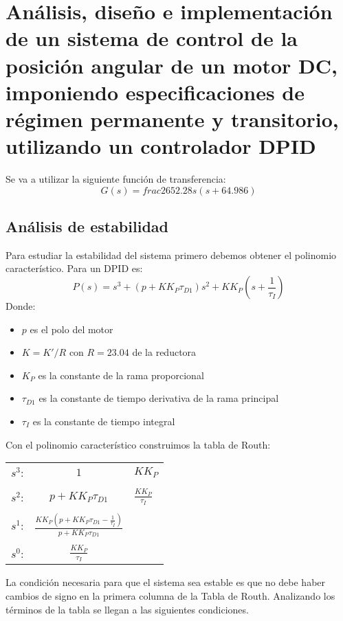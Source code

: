 \documentclass[a4paper]{article}
\begin{document}
\section{Análisis, diseño e implementación de un sistema de control de la posición angular de un motor DC, imponiendo especificaciones de régimen permanente y transitorio, utilizando un controlador D\textbar PID}
Se va a utilizar la siguiente función de transferencia:
\begin{equation}
G(s)=frac{2652.28}{s(s+64.986)}
\end{equation}
\subsection{Análisis de estabilidad \label{estabilidad}} 
Para estudiar la estabilidad del sistema primero debemos obtener el polinomio característico. Para un D\textbar PID es:
\begin{equation}
P(s)=s^3+(p+K K_P\tau_{D1})s^2+K K_P(s+\frac{1}{\tau_I})
\end{equation}
Donde:
\begin{itemize}
	\item $p$ es el polo del motor
	\item $K=K'/R$ con $R=23.04$ de la reductora
	\item $K_P$ es la constante de la rama proporcional
	\item $\tau_{D1}$ es la constante de tiempo derivativa de la rama principal
	\item $\tau_I$ es la constante de tiempo integral
\end{itemize}

Con el polinomio característico construimos la tabla de Routh:

\begin{tabular}{ccl}
	$s^3$: & $1$ & $K K_P$ \\ \\
	$s^2$: & $p+K K_P \tau_{D1}$ & $\displaystyle\frac{K K_P}{\tau_I}$ \\ \\
	$s^1$: & $\displaystyle\frac{K K_P (p+K K_P \tau_{D1} -\frac{1}{\tau_I})}{p+K K_P \tau_{D1}}$ & \\ \\
	$s^0$: & $\displaystyle\frac{K K_P}{\tau_I}$ &
\end{tabular}


La condición necesaria para que el sistema sea estable es que no debe haber cambios de signo en la primera columna de la Tabla de Routh. Analizando los términos de la tabla se llegan a las siguientes condiciones.
\end{document}
